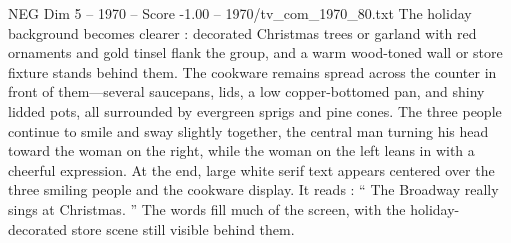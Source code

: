 \begin{textsample}{NEG Dim 5 – 1970 – Score -1.00 – 1970/tv\_com\_1970\_80.txt}
The holiday background becomes clearer : decorated Christmas trees or garland with red ornaments and gold tinsel flank the group, and a warm wood-toned wall or store fixture stands behind them.
The cookware remains spread across the counter in front of them—several saucepans, lids, a low copper-bottomed pan, and shiny lidded pots, all surrounded by evergreen sprigs and pine cones.
The three people continue to smile and sway slightly together, the central man turning his head toward the woman on the right, while the woman on the left leans in with a cheerful expression.
At the end, large white serif text appears centered over the three smiling people and the cookware display.
It reads : “ The Broadway really sings at Christmas. ” The words fill much of the screen, with the holiday-decorated store scene still visible behind them.

\end{textsample}
